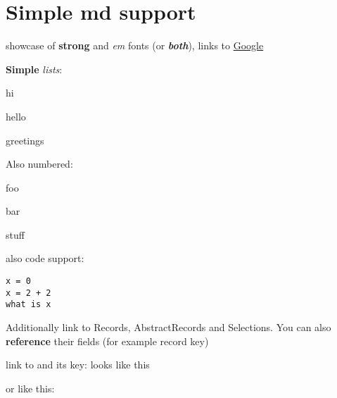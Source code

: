 {\section{Simple md support}
{showcase of \textbf{strong} and \textit{em} fonts (or \textbf{\textit{both}}), links to \href{google.com}{{Google}}}

{\textbf{Simple} \textit{lists}:}

\begin{itemize}
{\item hi}
{\item hello}
{\item greetings}
\end{itemize}
{Also numbered:}

\begin{enumerate}
{\item foo}
{\item bar}
{\item stuff}
\end{enumerate}
{also code support:}

{\begin{lstlisting}
x = 0
x = 2 + 2
what is x
\end{lstlisting}}

{Additionally link to Records, AbstractRecords and Selections. You can also \textbf{reference} their fields (for example record key)}

{link to  and its key:  looks like this}

{or like this:}

\begin{itemize}
{\item {}}
{\item {}}
{\item {}}
{\item {}}
{\item {}}
\end{itemize}}